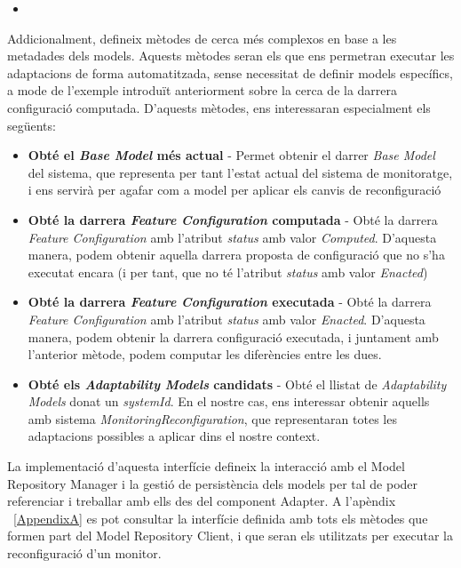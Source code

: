 \begin{itemize}
\item 
\end{itemize}
 
Addicionalment, defineix mètodes de cerca més complexos en base a les metadades dels models. Aquests mètodes seran els que ens permetran executar les adaptacions de forma automatitzada, sense necessitat de definir models específics, a mode de l'exemple introduït anteriorment sobre la cerca de la darrera configuració computada. D'aquests mètodes, ens interessaran especialment els següents:

\begin{itemize}
\item \textbf{Obté el \textit{Base Model} més actual} - Permet obtenir el darrer \textit{Base Model} del sistema, que representa per tant l'estat actual del sistema de monitoratge, i ens servirà per agafar com a model per aplicar els canvis de reconfiguració
\item \textbf{Obté la darrera \textit{Feature Configuration} computada} - Obté la darrera \textit{Feature Configuration} amb l'atribut \textit{status} amb valor \textit{Computed}. D'aquesta manera, podem obtenir aquella darrera proposta de configuració que no s'ha executat encara (i per tant, que no té l'atribut \textit{status} amb valor \textit{Enacted})
\item \textbf{Obté la darrera \textit{Feature Configuration} executada} - Obté la darrera \textit{Feature Configuration} amb l'atribut \textit{status} amb valor \textit{Enacted}. D'aquesta manera, podem obtenir la darrera configuració executada, i juntament amb l'anterior mètode, podem computar les diferències entre les dues.
\item \textbf{Obté els \textit{Adaptability Models} candidats} - Obté el llistat de \textit{Adaptability Models} donat un \textit{systemId}. En el nostre cas, ens interessar obtenir aquells amb sistema \textit{MonitoringReconfiguration}, que representaran totes les adaptacions possibles a aplicar dins el nostre context.
\end{itemize}

La implementació d'aquesta interfície defineix la interacció amb el Model Repository Manager i la gestió de persistència dels models per tal de poder referenciar i treballar amb ells des del component Adapter. A l'apèndix ~\ref{AppendixA} es pot consultar la interfície definida amb tots els mètodes que formen part del Model Repository Client, i que seran els utilitzats per executar la reconfiguració d'un monitor. 

